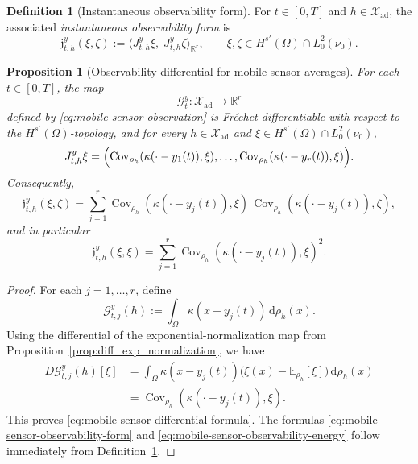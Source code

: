 \documentclass{article}
\newtheorem{proposition}[theorem]{Proposition}
\theoremstyle{definition}
\newtheorem{definition}[theorem]{Definition}
\renewcommand{\d}{\mathrm{d}}
\begin{document}
\begin{definition}[Instantaneous observability form]
    \label{def:ambient-observability-form}
    For \(t\in[0,T]\) and \(h\in\mathcal X_{\mathrm{ad}}\), the associated
    \emph{instantaneous observability form} is
    \[
        \mathfrak j_{t,h}^{y}(\xi,\zeta)
        :=
        \langle J_{t,h}^{y}\xi,\;J_{t,h}^{y}\zeta\rangle_{\mathbb R^r},
        \qquad
        \xi,\zeta\in H^{s'}(\Omega)\cap L^2_0(\nu_0).
    \]
\end{definition}

\begin{proposition}[Observability differential for mobile sensor averages]
    \label{prop:localized-sensor-differential}
    For each \(t\in[0,T]\), the map
    \[
        \mathcal G_t^{y}:\mathcal X_{\mathrm{ad}}\to\mathbb R^r
    \]
    defined by \eqref{eq:mobile-sensor-observation} is Fr\'echet differentiable with respect to the
    \(H^{s'}(\Omega)\)-topology, and for every \(h\in\mathcal X_{\mathrm{ad}}\) and
    \(\xi\in H^{s'}(\Omega)\cap L^2_0(\nu_0)\),
    \begin{equation}
        \label{eq:mobile-sensor-differential-formula}
        J_{t,h}^{y}\xi
        =
        \Bigl(
        \operatorname{Cov}_{\rho_h}(\kappa(\cdot-y_1(t)),\xi),\dots,
        \operatorname{Cov}_{\rho_h}(\kappa(\cdot-y_r(t)),\xi)
        \Bigr).
    \end{equation}
    Consequently,
    \begin{equation}
        \label{eq:mobile-sensor-observability-form}
        \mathfrak j_{t,h}^{y}(\xi,\zeta)
        =
        \sum_{j=1}^r
        \operatorname{Cov}_{\rho_h}(\kappa(\cdot-y_j(t)),\xi)\,
        \operatorname{Cov}_{\rho_h}(\kappa(\cdot-y_j(t)),\zeta),
    \end{equation}
    and in particular
    \begin{equation}
        \label{eq:mobile-sensor-observability-energy}
        \mathfrak j_{t,h}^{y}(\xi,\xi)
        =
        \sum_{j=1}^r
        \operatorname{Cov}_{\rho_h}(\kappa(\cdot-y_j(t)),\xi)^2.
    \end{equation}
\end{proposition}

\begin{proof}
    For each \(j=1,\dots,r\), define
    \[
        \mathcal G_{t,j}^{y}(h):=\int_\Omega \kappa(x-y_j(t))\,\d\rho_h(x).
    \]
    Using the differential of the exponential-normalization map from Proposition~\ref{prop:diff_exp_normalization}, we have
    \begin{align*}
        D\mathcal G_{t,j}^{y}(h)[\xi]
         & =
        \int_\Omega \kappa(x-y_j(t))
        \bigl(\xi(x)-\mathbb E_{\rho_h}[\xi]\bigr)\,\d\rho_h(x) \\
         & =
        \operatorname{Cov}_{\rho_h}(\kappa(\cdot-y_j(t)),\xi).
    \end{align*}
    This proves \eqref{eq:mobile-sensor-differential-formula}. The formulas
    \eqref{eq:mobile-sensor-observability-form} and
    \eqref{eq:mobile-sensor-observability-energy} follow immediately from
    Definition~\ref{def:ambient-observability-form}.
\end{proof}
\end{document}
